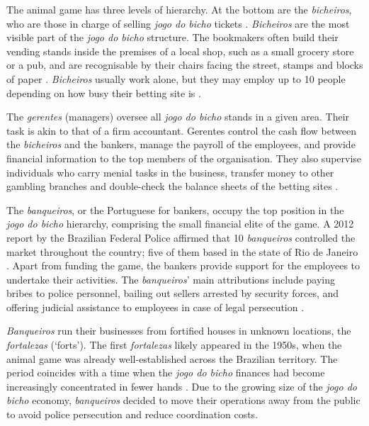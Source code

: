 \documentclass[a4paper,12pt]{article}
\begin{document}
The animal game has three levels of hierarchy. At the bottom are the \emph{bicheiros}, who are those in charge of selling \emph{jogo do bicho} tickets \citep{chazkel2007beyond, chazkel2011laws, da1999aguias, labronici2014sorteio, magalhaes2005ganhou, misse2007illegal}. \emph{Bicheiros} are the most visible part of the \emph{jogo do bicho} structure. The bookmakers often build their vending stands inside the premises of a local shop, such as a small grocery store or a pub, and are recognisable by their chairs facing the street, stamps and blocks of paper \citep[259]{chazkel2011laws}. \emph{Bicheiros} usually work alone, but they may employ up to 10 people depending on how busy their betting site is \citep[69]{labronici2014sorteio}.

The \emph{gerentes} (managers) oversee all \emph{jogo do bicho} stands in a given area. Their task is akin to that of a firm accountant. Gerentes control the cash flow between the \emph{bicheiros} and the bankers, manage the payroll of the employees, and provide financial information to the top members of the organisation. They also supervise individuals who carry menial tasks in the business, transfer money to other gambling branches and double-check the balance sheets of the betting sites \citetext{\citealp[71]{labronici2012paratodos}; \citealp[142]{misse2007illegal}}.

The \emph{banqueiros}, or the Portuguese for bankers, occupy the top position in the \emph{jogo do bicho} hierarchy, comprising the small financial elite of the game. A 2012 report by the Brazilian Federal Police affirmed that 10 \emph{banqueiros} controlled the market throughout the country; five of them based in the state of Rio de Janeiro \citep{globo2012contraventores}. Apart from funding the game, the bankers provide support for the employees to undertake their activities. The \emph{banqueiros}' main attributions include paying bribes to police personnel, bailing out sellers arrested by security forces, and offering judicial assistance to employees in case of legal persecution \citep[75]{labronici2012paratodos}.

\emph{Banqueiros} run their businesses from fortified houses in unknown locations, the \emph{fortalezas} (`forts'). The first \emph{fortalezas} likely appeared in the 1950s, when the animal game was already well-established across the Brazilian territory. The period coincides with a time when the \emph{jogo do bicho} finances had become increasingly concentrated in fewer hands \citep[259]{chazkel2011laws}. Due to the growing size of the \emph{jogo do bicho} economy, \emph{banqueiros} decided to move their operations away from the public to avoid police persecution and reduce coordination costs.
\end{document}
